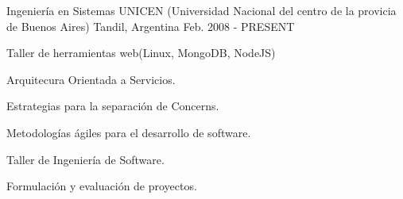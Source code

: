 


\begin{cventries}


\cventry
{Ingeniería en Sistemas} %
{UNICEN (Universidad Nacional del centro de la provicia de Buenos Aires)} %
{Tandil, Argentina} %
{Feb. 2008 - PRESENT} %
{ %
\begin{cvitems}
\item {Taller de herramientas web(Linux, MongoDB, NodeJS)}
\item {Arquitecura Orientada a Servicios.}
\item {Estrategias para la separación de Concerns.}
\item {Metodologías ágiles para el desarrollo de software.}
\item {Taller de Ingeniería de Software.}
\item {Formulación y evaluación de proyectos.}
\end{cvitems}
}


\end{cventries}
